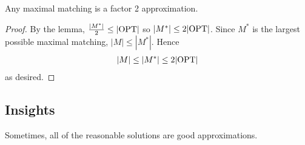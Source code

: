 \documentclass{article}
\begin{document}
\begin{theorem*}
    Any maximal matching is a factor 2 approximation.
\end{theorem*}

\begin{proof}
    By the lemma, $\frac{|M^*|}{2} \leq |\mathrm{OPT}|$ so $|M^*| \leq 2 |\mathrm{OPT}|$. Since $M^*$ is
    the largest possible maximal matching, $|M| \leq |M^*|$. Hence
    \begin{align*}
        |M| \leq |M^*| \leq 2 |\mathrm{OPT}|
    \end{align*}
    as desired.
\end{proof}

\subsection*{Insights}

Sometimes, all of the reasonable solutions are good approximations.
\end{document}
